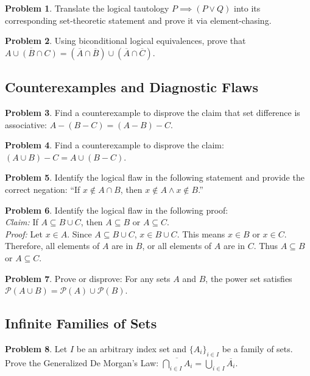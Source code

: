 \documentclass[12pt]{article}
\theoremstyle{definition}
\newtheorem{problem}{Problem}
\begin{document}
\begin{problem}
Translate the logical tautology $P \implies (P \lor Q)$ into its corresponding set-theoretic statement and prove it via element-chasing.
\end{problem}

\begin{problem}
Using biconditional logical equivalences, prove that $\overline{A \cup (B \cap C)} = (\overline{A} \cap \overline{B}) \cup (\overline{A} \cap \overline{C})$.
\end{problem}

\subsection{Counterexamples and Diagnostic Flaws}
\begin{problem}
Find a counterexample to disprove the claim that set difference is associative: $A - (B - C) = (A - B) - C$.
\end{problem}

\begin{problem}
Find a counterexample to disprove the claim: $(A \cup B) - C = A \cup (B - C)$.
\end{problem}

\begin{problem}
Identify the logical flaw in the following statement and provide the correct negation: ``If $x \notin A \cap B$, then $x \notin A \land x \notin B$.''
\end{problem}

\begin{problem}
Identify the logical flaw in the following proof: \\
\textit{Claim:} If $A \subseteq B \cup C$, then $A \subseteq B$ or $A \subseteq C$. \\
\textit{Proof:} Let $x \in A$. Since $A \subseteq B \cup C$, $x \in B \cup C$. This means $x \in B$ or $x \in C$. Therefore, all elements of $A$ are in $B$, or all elements of $A$ are in $C$. Thus $A \subseteq B$ or $A \subseteq C$.
\end{problem}

\begin{problem}
Prove or disprove: For any sets $A$ and $B$, the power set satisfies $\mathcal{P}(A \cup B) = \mathcal{P}(A) \cup \mathcal{P}(B)$.
\end{problem}

\subsection{Infinite Families of Sets}
\begin{problem}
Let $I$ be an arbitrary index set and $\{A_i\}_{i \in I}$ be a family of sets. Prove the Generalized De Morgan's Law: $\overline{\bigcap_{i \in I} A_i} = \bigcup_{i \in I} \overline{A_i}$.
\end{problem}
\end{document}

